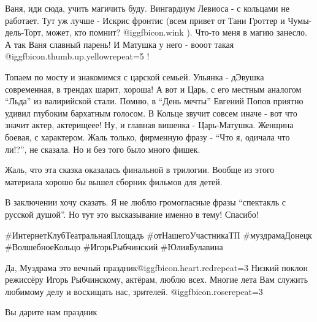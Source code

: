 Ваня, иди сюда, учить магичить буду. Вингардиум Левиоса - с кольцами не
работает. Тут уж лучше - Искрис фронтис (всем привет от Тани Гроттер и
Чумы-дель-Торт, может, кто помнит?  @igg{fbicon.wink} ). Что-то меня в магию
занесло. А так Ваня славный парень! И Матушка у него - вооот такая
@igg{fbicon.thumb.up.yellow}{repeat=5} !

Топаем по мосту и знакомимся с царской семьей. Ульянка - дЭвушка современная, в
трендах шарит, хороша! А вот и Царь, с его местным аналогом \enquote{Льда} из
валирийской стали. Помню, в \enquote{День мечты} Евгений Попов приятно удивил
глубоким бархатным голосом. В Кольце звучит совсем иначе - вот что значит
актер, актерищеее! Ну, и главная вишенка - Царь-Матушка. Женщина боевая, с
характером.  Жаль только, фирменную фразу - \enquote{Что я, одичала что ли!?},
не сказала. Но и без того было много фишек.

Жаль, что эта сказка оказалась финальной в трилогии. Вообще из этого материала
хорошо бы вышел сборник фильмов для детей.

В заключении хочу сказать. Я не люблю громогласные фразы \enquote{спектакль с
русской душой}. Но тут это высказывание именно в тему! Спасибо!

\#ИнтернетКлубТеатральнаяПлощадь \#отНашегоУчастникаТП \#муздрамаДонецк
\#ВолшебноеКольцо \#ИгорьРыбчинский \#ЮлияБулавина

\begin{itemize} %

Да, Муздрама это вечный праздник@igg{fbicon.heart.red}{repeat=3} Низкий поклон
режиссёру Игорь Рыбчинскому, актёрам, люблю всех. Многие лета Вам служить
любимому делу и восхищать нас, зрителей. @igg{fbicon.rose}{repeat=3} 

Вы дарите нам праздник
\end{itemize} %
